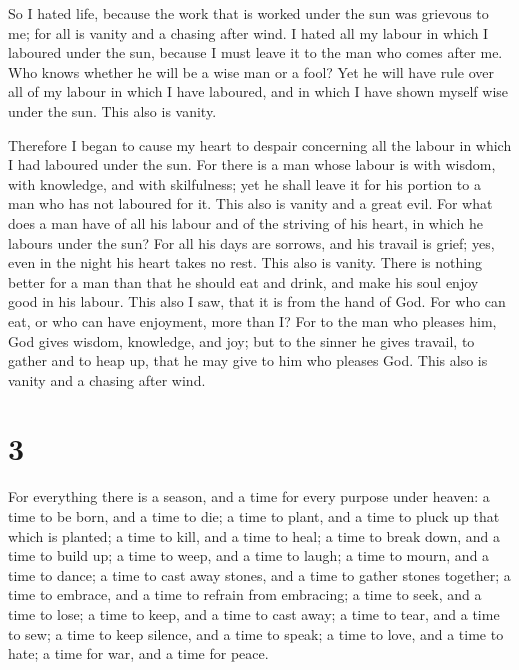  So I hated life, because the work that is worked under the
sun was grievous to me; for all is vanity and a chasing after wind.
 I hated all my labour in which I laboured under the sun,
because I must leave it to the man who comes after me.  Who
knows whether he will be a wise man or a fool? Yet he will have rule
over all of my labour in which I have laboured, and in which I have
shown myself wise under the sun. This also is vanity.

 Therefore I began to cause my heart to despair concerning
all the labour in which I had laboured under the sun.  For
there is a man whose labour is with wisdom, with knowledge, and with
skilfulness; yet he shall leave it for his portion to a man who has not
laboured for it. This also is vanity and a great evil.  For
what does a man have of all his labour and of the striving of his heart,
in which he labours under the sun?  For all his days are
sorrows, and his travail is grief; yes, even in the night his heart
takes no rest. This also is vanity.  There is nothing
better for a man than that he should eat and drink, and make his soul
enjoy good in his labour. This also I saw, that it is from the hand of
God.  For who can eat, or who can have enjoyment, more than
I?  For to the man who pleases him, God gives wisdom,
knowledge, and joy; but to the sinner he gives travail, to gather and to
heap up, that he may give to him who pleases God. This also is vanity
and a chasing after wind.

\hypertarget{section-2}{%
\section{3}\label{section-2}}

 For everything there is a season, and a time for every
purpose under heaven:  a time to be born, and a time to die;
a time to plant, and a time to pluck up that which is planted;
 a time to kill, and a time to heal; a time to break down,
and a time to build up;  a time to weep, and a time to
laugh; a time to mourn, and a time to dance;  a time to cast
away stones, and a time to gather stones together; a time to embrace,
and a time to refrain from embracing;  a time to seek, and a
time to lose; a time to keep, and a time to cast away;  a
time to tear, and a time to sew; a time to keep silence, and a time to
speak;  a time to love, and a time to hate; a time for war,
and a time for peace.


